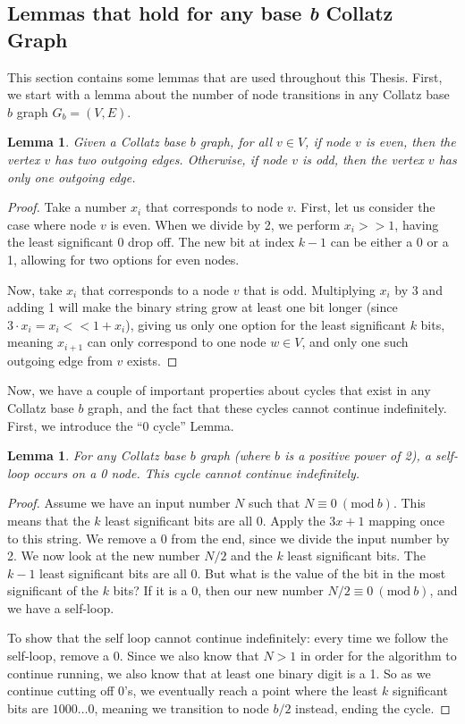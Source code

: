 \documentclass[12pt]{article}
\newcommand{\Mod}[1]{\ (\mathrm{mod}\ #1)}
\newtheorem{lemma}[theorem]{Lemma}
\theoremstyle{definition}
\begin{document}
\subsection{Lemmas that hold for any base \textit{b} Collatz Graph}
This section contains some lemmas that are used throughout this Thesis. First, we start with a lemma about the number of node transitions in any Collatz base $b$ graph $G_b= (V,E)$.
\begin{lemma}
\label{lem:numOutEdges}
Given a Collatz base $b$ graph, for all $v \in V$, if node $v$ is even, then the vertex $v$ has two outgoing edges. Otherwise, if node $v$ is odd, then the vertex $v$ has only one outgoing edge.
\end{lemma}
\begin{proof}
Take a number $x_i$ that corresponds to node $v$. First, let us consider the case where node $v$ is even. When we divide by 2, we perform $x_i >> 1$, having the least significant 0 drop off. The new bit at index $k-1$ can be either a 0 or a 1, allowing for two options for even nodes. \par
Now, take $x_i$ that corresponds to a node $v$ that is odd. Multiplying $x_i$ by 3 and adding 1 will make the binary string grow at least one bit longer (since $3\cdot x_i = x_i << 1 + x_i$), giving us only one option for the least significant $k$ bits, meaning $x_{i+1}$ can only correspond to one node $w \in V$, and only one such outgoing edge from $v$ exists.
\end{proof}
Now, we have a couple of important properties about cycles that exist in any Collatz base $b$ graph, and the fact that these cycles cannot continue indefinitely. First, we introduce the ``0 cycle'' Lemma.
\begin{lemma}
\label{lem:zeroCycle}
For any Collatz base $b$ graph (where $b$ is a positive power of 2), a self-loop occurs on a 0 node. This cycle cannot continue indefinitely.
\end{lemma}
\begin{proof}
Assume we have an input number $N$ such that $N \equiv 0 \Mod{b}$. This means that the $k$ least significant bits are all 0. Apply the $3x+1$ mapping once to this string. We remove a 0 from the end, since we divide the input number by 2. We now look at the new number $N/2$ and the $k$ least significant bits. The $k-1$ least significant bits are all 0. But what is the value of the bit in the most significant of the $k$ bits? If it is a 0, then our new number $N/2 \equiv 0 \Mod{b}$, and we have a self-loop. \par
To show that the self loop cannot continue indefinitely: every time we follow the self-loop, remove a 0. Since we also know that $N > 1$ in order for the algorithm to continue running, we also know that at least one binary digit is a 1. So as we continue cutting off 0's, we eventually reach a point where the least $k$ significant bits are $1000\ldots 0$, meaning we transition to node $b/2$ instead, ending the cycle.
\end{proof}
\end{document}
